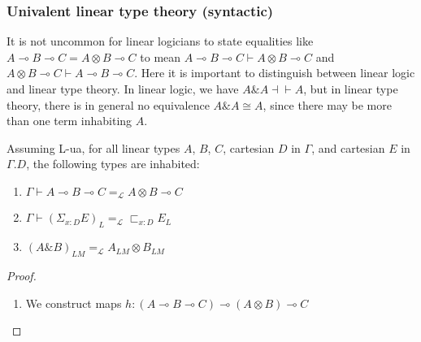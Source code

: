 \subsubsection{Univalent linear type theory (syntactic)}
It is not uncommon for linear logicians to state equalities like $A \multimap B \multimap C = A \otimes B \multimap C$ to mean $A \multimap B \multimap C \vdash A \otimes B \multimap C$ and $A \otimes B \multimap C \vdash A \multimap B \multimap C$. Here it is important to distinguish between linear logic and linear type theory. In linear logic, we have $A \& A \dashv \vdash A$, but in linear type theory, there is in general no equivalence $A \& A \cong A$, since there may be more than one term inhabiting $A$.
  \begin{thm}
    Assuming L-ua, for all linear types $A$, $B$, $C$, cartesian $D$ in $\Gamma$, and cartesian $E$ in $\Gamma.D$, the following types are inhabited:
    \begin{enumerate}
    \item $\Gamma \vdash A \multimap B \multimap C =_{\mathcal{L}} A \otimes B \multimap C$
    \item $\Gamma \vdash (\Sigma_{x : D}E)_L =_{\mathcal{L}}\sqsubset_{x :D}E_L$
    \item $(A \& B)_{LM} =_{\mathcal{L}} A_{LM} \otimes B_{LM}$
    \end{enumerate}
    \begin{proof}
      \begin{enumerate}
      \item We construct maps $h : (A \multimap B \multimap C) \multimap (A \otimes B) \multimap C$
        \begin{prooftree}

\end{prooftree}
\end{enumerate}
\end{proof}
\end{thm}
